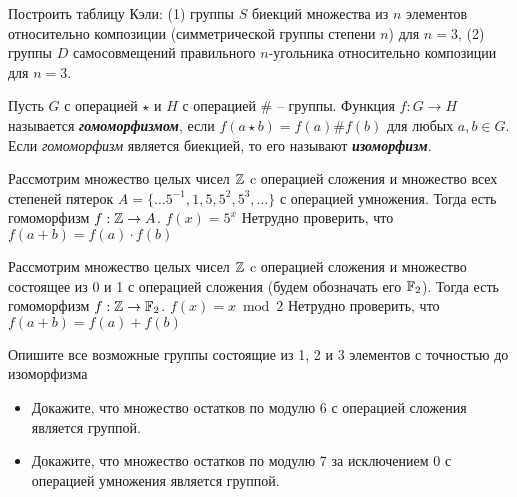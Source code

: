 \documentclass{article}
\begin{document}
    \begin{task_boxed}
        Построить таблицу Кэли:
        (1) группы $S$ биекций множества из $n$ элементов относительно композиции (симметрической группы степени $n$) для $n = 3$,
        (2) группы $D$ самосовмещений правильного $n$-угольника относительно композиции для $n = 3$.
    \end{task_boxed}

    \begin{definition_boxed}
        Пусть $G$ с операцией $\star$ и $H$ с операцией $\#$ – группы.
        Функция $f: G \to H$ называется \textbf{\textit{гомоморфизмом}}, если $f(a \star b) = f(a) \# f(b)$ для любых $a, b \in G$.\\
        Если \textit{гомоморфизм} является биекцией, то его называют \textbf{\textit{изоморфизм}}.
    \end{definition_boxed}

    \begin{example}
        Рассмотрим множество целых чисел $\mathbb{Z}$ c операцией сложения и множество всех степеней пятерок $A = \{\dotsc 5^{-1}, 1, 5, 5^{2}, 5^{3}, \dotsc\}$ с операцией умножения.
        Тогда есть гомоморфизм $f : \mathbb{Z} \rightarrow A$. $f(x) = 5^x$
        Нетрудно проверить, что $f(a + b) = f(a) \cdot f(b)$
    \end{example}

    \begin{example}
        Рассмотрим множество целых чисел $\mathbb{Z}$ c операцией сложения и множество состоящее из 0 и 1 с операцией сложения (будем обозначать его $\mathbb{F}_2$). Тогда есть гомоморфизм $f : \mathbb{Z} \rightarrow \mathbb{F}_2$. $f(x) = x \bmod 2$
        Нетрудно проверить, что $f(a + b) = f(a) + f(b)$
    \end{example}

    \begin{task_boxed}
        Опишите все возможные группы состоящие из 1, 2 и 3 элементов с точностью до изоморфизма
    \end{task_boxed}

    \begin{task_boxed}
        \begin{itemize}
            \item Докажите, что множество остатков по модулю 6 с операцией сложения является группой.
            \item Докажите, что множество остатков по модулю 7 за исключением 0 с операцией умножения является группой.
        \end{itemize}
    \end{task_boxed}
\end{document}
